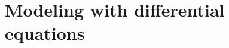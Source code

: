 \section{Modeling with differential equations} \label{S:7.5.Modeling}



\newpage



\newpage



\newpage

\clearpage
